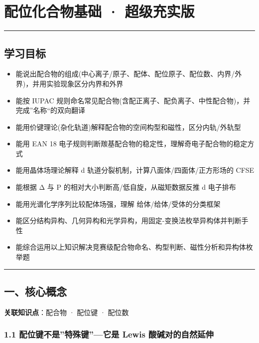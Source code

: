 \section{配位化合物基础 · 超级充实版}\label{ux914dux4f4dux5316ux5408ux7269ux57faux7840-ux8d85ux7ea7ux5145ux5b9eux7248}

\begin{center}\rule{0.5\linewidth}{0.5pt}\end{center}

\subsection{学习目标}\label{ux5b66ux4e60ux76eeux6807}

\begin{itemize}
\tightlist
\item
  能说出配合物的组成(中心离子/原子、配体、配位原子、配位数、内界/外界)，并用实验现象区分内界和外界
\item
  能按 IUPAC 规则命名常见配合物(含配正离子、配负离子、中性配合物)，并完成''名称``的双向翻译
\item
  能用价键理论(杂化轨道)解释配合物的空间构型和磁性，区分内轨/外轨型
\item
  能用 EAN 18 电子规则判断羰基配合物的稳定性，理解奇电子配合物的稳定方式
\item
  能用晶体场理论解释 d 轨道分裂机制，计算八面体/四面体/正方形场的 CFSE
\item
  能根据 Δ 与 P 的相对大小判断高/低自旋，从磁矩数据反推 d 电子排布
\item
  能用光谱化学序列比较配体场强，理解  给体/\派 给体/\派 受体的分类框架
\item
  能区分结构异构、几何异构和光学异构，用固定-变换法枚举异构体并判断手性
\item
  能综合运用以上知识解决竞赛级配合物命名、构型判断、磁性分析和异构体枚举题
\end{itemize}

\begin{center}\rule{0.5\linewidth}{0.5pt}\end{center}

\subsection{一、核心概念}\label{ux4e00ux6838ux5fc3ux6982ux5ff5}

\textbf{关联知识点}：配合物 · 配位键 · 配位数

\subsubsection{1.1 配位键不是''特殊键''---它是 Lewis 酸碱对的自然延伸}\label{ux914dux4f4dux952eux4e0dux662fux7279ux6b8aux952eux5b83ux662f-lewis-ux9178ux78b1ux5bf9ux7684ux81eaux7136ux5ef6ux4f38}

